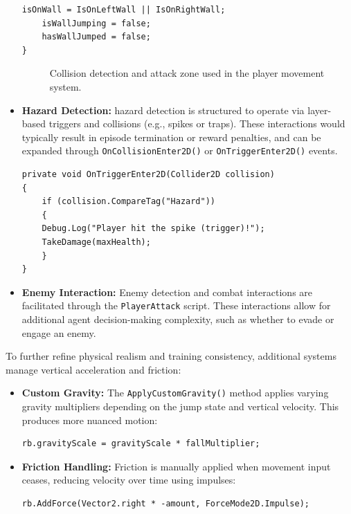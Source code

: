 \documentclass[12pt,oneside,openright,a4paper]{cpe-english-project}
\begin{document}
\begin{itemize}
\begin{lstlisting}[language={[Sharp]C}]
	isOnWall = IsOnLeftWall || IsOnRightWall;
	isWallJumping = false;
	hasWallJumped = false;
}
\end{lstlisting}
\begin{figure}[H]
\centering
{}
\caption{Collision detection and attack zone used in the player movement system.}\label{fig:CollisionDetection}
\end{figure}
\item  \textbf{Hazard Detection:} hazard detection is structured to operate via layer-based triggers and collisions (e.g., spikes or traps). These interactions would typically result in episode termination or reward penalties, and can be expanded through \texttt{OnCollisionEnter2D()} or \texttt{OnTriggerEnter2D()} events.

\begin{lstlisting}[language={[Sharp]C}]
private void OnTriggerEnter2D(Collider2D collision)
{
    if (collision.CompareTag("Hazard"))
    {
	Debug.Log("Player hit the spike (trigger)!");
	TakeDamage(maxHealth);
    }
}
\end{lstlisting}

\item  \textbf{Enemy Interaction:} Enemy detection and combat interactions are facilitated through the \texttt{PlayerAttack} script. These interactions allow for additional agent decision-making complexity, such as whether to evade or engage an enemy.
\end{itemize}
To further refine physical realism and training consistency, additional systems manage vertical acceleration and friction:
\begin{itemize}
\item \textbf{Custom Gravity:} The \texttt{ApplyCustomGravity()} method applies varying gravity multipliers depending on the jump state and vertical velocity. This produces more nuanced motion:
\begin{lstlisting}[language={[Sharp]C}]
rb.gravityScale = gravityScale * fallMultiplier;
\end{lstlisting}
\item \textbf{Friction Handling:} Friction is manually applied when movement input ceases, reducing velocity over time using impulses:
\begin{lstlisting}[language={[Sharp]C}]
rb.AddForce(Vector2.right * -amount, ForceMode2D.Impulse);
\end{lstlisting}
\end{itemize}
\end{document}

